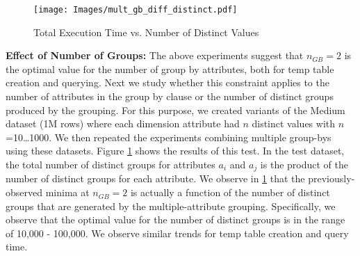 \begin{figure}[h]
  \centering
    \texttt{[image: Images/mult\_gb\_diff\_distinct.pdf]}
    \caption{Total Execution Time vs. Number of Distinct Values} 
  \label{fig:total_time_diff_distinct}

\end{figure}

{\bf Effect of Number of Groups:} The above experiments suggest that $n_{GB}=2$
is the optimal value for the number of group by attributes, both for temp table
creation and querying.
Next we study whether this constraint applies to the number of attributes in the
group by clause or the number of distinct groups produced by the grouping. For
this purpose, we created variants of the Medium dataset (1M rows) where each
dimension attribute had $n$ distinct values with $n$=10\ldots1000. We then
repeated the experiments combining multiple group-bys using these datasets.
Figure \ref{fig:total_time_diff_distinct} shows the results of this test. In the
test dataset, the total number of distinct groups for attributes $a_i$ and $a_j$
is the product of the number of distinct groups for each attribute. We observe
in \ref{fig:total_time_diff_distinct} that the previously-observed minima at
$n_{GB}=2$ is actually a function of the number of distinct groups that are
generated by the multiple-attribute grouping.
Specifically, we observe that the optimal value for the number of distinct
groups is in the range of 10,000 - 100,000. We observe similar trends for temp
table creation and query time.


% 

